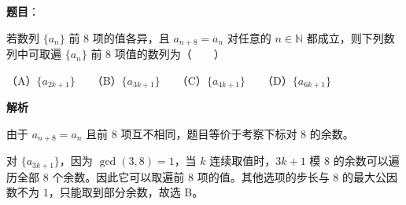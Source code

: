 \begin{answer}

\textbf{题目}：

若数列 $\{a_n\}$ 前 $8$ 项的值各异，且 $a_{n+8}=a_n$ 对任意的 $n\in\mathbb N$ 都成立，则下列数列中可取遍 $\{a_n\}$ 前 $8$ 项值的数列为\mbox{（　　）}

（A）$\{a_{2k+1}\}$　　（B）$\{a_{3k+1}\}$　　（C）$\{a_{4k+1}\}$　　（D）$\{a_{6k+1}\}$

\textbf{解析}

由于 $a_{n+8}=a_n$ 且前 $8$ 项互不相同，题目等价于考察下标对 $8$ 的余数。

对 $\{a_{3k+1}\}$，因为 $\gcd(3,8)=1$，当 $k$ 连续取值时，$3k+1$ 模 $8$ 的余数可以遍历全部 $8$ 个余数。因此它可以取遍前 $8$ 项的值。其他选项的步长与 $8$ 的最大公因数不为 $1$，只能取到部分余数，故选 B。


\end{answer}

